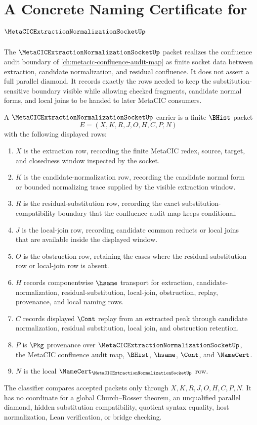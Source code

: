 \chapter{A Concrete Naming Certificate for $\MetaCICExtractionNormalizationSocketUp$}
\label{ch:concrete-instances-metacic-extraction-normalization-socket-namecert}

The $\MetaCICExtractionNormalizationSocketUp$ packet realizes the confluence audit boundary of \autoref{ch:metacic-confluence-audit-map} as finite socket data between extraction, candidate normalization, and residual confluence. It does not assert a full parallel diamond. It records exactly the rows needed to keep the substitution-sensitive boundary visible while allowing checked fragments, candidate normal forms, and local joins to be handed to later MetaCIC consumers.

\begin{definition}
\label{def:metacic-extraction-normalization-socket-carrier}
A $\MetaCICExtractionNormalizationSocketUp$ carrier is a finite $\BHist$ packet
$$
E=(X,K,R,J,O,H,C,P,N)
$$
with the following displayed rows:
\begin{enumerate}
\item $X$ is the extraction row, recording the finite MetaCIC redex, source, target, and closedness window inspected by the socket.
\item $K$ is the candidate-normalization row, recording the candidate normal form or bounded normalizing trace supplied by the visible extraction window.
\item $R$ is the residual-substitution row, recording the exact substitution-compatibility boundary that the confluence audit map keeps conditional.
\item $J$ is the local-join row, recording candidate common reducts or local joins that are available inside the displayed window.
\item $O$ is the obstruction row, retaining the cases where the residual-substitution row or local-join row is absent.
\item $H$ records componentwise $\hsame$ transport for extraction, candidate-normalization, residual-substitution, local-join, obstruction, replay, provenance, and local naming rows.
\item $C$ records displayed $\Cont$ replay from an extracted peak through candidate normalization, residual substitution, local join, and obstruction retention.
\item $P$ is $\Pkg$ provenance over $\MetaCICExtractionNormalizationSocketUp$, the MetaCIC confluence audit map, $\BHist$, $\hsame$, $\Cont$, and $\NameCert$.
\item $N$ is the local $\NameCert_{\MetaCICExtractionNormalizationSocketUp}$ row.
\end{enumerate}
The classifier compares accepted packets only through $X,K,R,J,O,H,C,P,N$. It has no coordinate for a global Church--Rosser theorem, an unqualified parallel diamond, hidden substitution compatibility, quotient syntax equality, host normalization, Lean verification, or bridge checking.
\end{definition}

